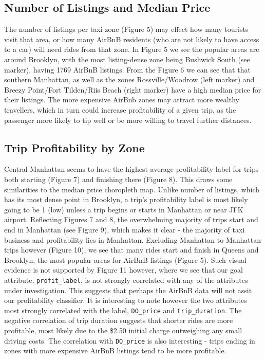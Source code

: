 \documentclass[11pt]{article}
\begin{document}
\subsection{Number of Listings and Median Price}
The number of listings per taxi zone (Figure 5) may effect how many tourists visit that area, or how many AirBnB residents (who are not likely to have access to a car) will need rides from that zone. In Figure 5 we see the popular areas are around Brooklyn, with the most listing-dense zone being Bushwick South (see marker), having 1769 AirBnB listings. From the Figure 6 we can see that that southern Manhattan, as well as the zones Rossville/Woodrow (left marker) and Breezy Point/Fort Tilden/Riis Beach (right marker) have a high median price for their listings. The more expensive AirBnb zones may attract more wealthy travellers, which in turn could increase profitability of a given trip, as the passenger more likely to tip well or be more willing to travel further distances.

\subsection{Trip Profitability by Zone}
Central Manhattan seems to have the highest average profitability label for trips both starting (Figure 7) and finishing there (Figure 8). This draws some similarities to the median price choropleth map. Unlike number of listings, which has its most dense point in Brooklyn, a trip's profitability label is most likely going to be 1 (low) unless a trip begins or starts in Manhattan or near JFK airport. Reflecting Figures 7 and 8, the overwhelming majority of trips start and end in Manhattan (see Figure 9), which makes it clear - the majority of taxi business and profitability lies in Manhattan. Excluding Manhattan to Manhattan trips however (Figure 10), we see that many rides start and finish in Queens and Brooklyn, the most popular areas for AirBnB listings (Figure 5). Such visual evidence is not supported by Figure 11 however, where we see that our goal attribute, \verb|profit_label|, is not strongly correlated with any of the attributes under investigation. This suggests that perhaps the AirBnB data will not assit our profitability classifier. It is interesting to note however the two attributes most strongly correlated with the label, \verb|DO_price| and \verb|trip_duration|. The negative correlation of trip duration suggests that shorter rides are more profitable, most likely due to the \$2.50 initial charge \cite{taxi_fare} outweighing any small driving costs. The correlation with \verb|DO_price| is also interesting - trips ending in zones with more expensive AirBnB listings tend to be more profitable.
\end{document}
